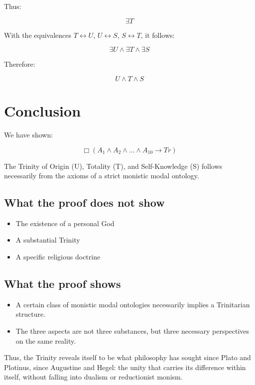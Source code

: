 \documentclass[
]{article}
\begin{document}
Thus:

\[
\exists T
\]

With the equivalences \(T \leftrightarrow U\), \(U \leftrightarrow S\), \(S \leftrightarrow T\), it follows:

\[
\exists U \land \exists T \land \exists S
\]

Therefore:

\[
\boxed{U \land T \land S}
\]

\section{Conclusion}\label{conclusion}

We have shown:

\[
\boxed{\Box(A_1 \land A_2 \land ... \land A_{10} \rightarrow Tr)}
\]

The Trinity of Origin (U), Totality (T), and Self-Knowledge (S) follows necessarily from the axioms of a strict monistic modal ontology.

\subsection{What the proof does not show}\label{what-the-proof-does-not-show}

\begin{itemize}
\item The existence of a personal God
\item A substantial Trinity
\item A specific religious doctrine
\end{itemize}

\subsection{What the proof shows}\label{what-the-proof-shows}

\begin{itemize}
\item A certain class of monistic modal ontologies necessarily implies a Trinitarian structure.
\item The three aspects are not three substances, but three necessary perspectives on the same reality.
\end{itemize}

Thus, the Trinity reveals itself to be what philosophy has sought since Plato and Plotinus, since Augustine and Hegel: the unity that carries its difference within itself, without falling into dualism or reductionist monism.
\end{document}
